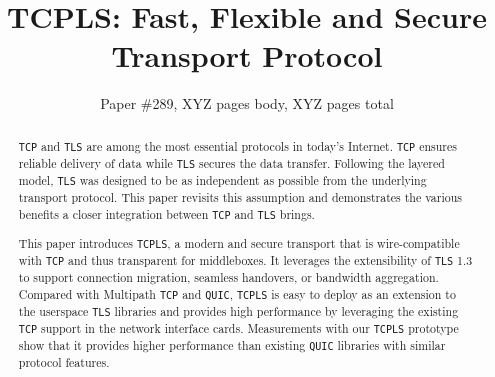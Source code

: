 \documentclass[sigconf]{acmart}
\newcommand{\tcpls}{\texttt{TCPLS}\xspace}
\newcommand{\tcp}{\texttt{TCP}\xspace}
\newcommand{\tls}{\texttt{TLS}\xspace}
\newcommand{\quic}{\texttt{QUIC}\xspace}
\begin{document}
\title{TCPLS: Fast, Flexible and Secure Transport Protocol}

\author{Paper \#289, XYZ pages body, XYZ pages total}

\renewcommand{\shortauthors}{X.et al.}


\begin{abstract}
  \tcp and \tls are among the most essential protocols in today's Internet. \tcp ensures reliable delivery of data while \tls secures the data transfer. Following the layered model, \tls was designed to be as independent as possible from the underlying transport protocol. This paper revisits this assumption and demonstrates the various benefits a closer integration between \tcp and \tls brings.

  This paper introduces \tcpls, a modern and secure transport that is wire-compatible with \tcp and thus transparent for middleboxes. It leverages the extensibility of \tls 1.3 to support connection migration, seamless handovers, or bandwidth aggregation. Compared with Multipath \tcp and \quic, \tcpls is easy to deploy as an extension to the userspace \tls libraries and provides high performance by leveraging the existing \tcp support in the network interface cards. Measurements with our \tcpls prototype show that it provides higher performance than existing \quic libraries with similar protocol features.

\end{abstract}
\maketitle






\appendix
\label{sec:appendices}

\end{document}
